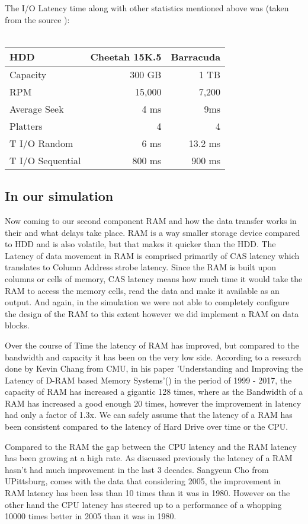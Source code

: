 \documentclass[12pt]{article}
\begin{document}
The I/O Latency time along with other statistics mentioned above was (taken from the source \cite{three}): 
\\\\
\begin{tabular}{|l|rr|}
  \hline
  HDD & Cheetah 15K.5 & Barracuda\\
  \hline
  Capacity & 300 GB & 1 TB\\
  \hline
  RPM & 15,000 & 7,200\\
  \hline
  Average Seek & 4 ms & 9ms\\
  \hline
  Platters & 4 & 4\\
  \hline
  T I/O Random & 6 ms & 13.2 ms\\
  \hline
  T I/O Sequential & 800 ms & 900 ms\\
  \hline
\end {tabular}

\subsection*{In our simulation}

Now coming to our second component RAM and how the data transfer works in their and what delays take place.
RAM is a way smaller storage device compared to HDD and is also volatile, but that makes it quicker than
the HDD. The Latency of data movement in RAM is comprised primarily of CAS latency which translates to
Column Address strobe latency. Since the RAM is built upon columns or cells of memory,
CAS latency means how much time it would take the RAM to access the memory cells, read the data and make it
available as an output. And again, in the simulation we were not able to completely configure the design of
the RAM to this extent however we did implement a RAM on data blocks.

Over the course of Time the latency of RAM has improved, but compared to the bandwidth and capacity it has
been on the very low side. According to a research done by Kevin Chang from CMU, in his paper 'Understanding
and Improving the Latency of D-RAM based Memory Systems'(\cite {DRAMTimings}) in the period of 1999 - 2017,
the capacity of RAM has increased a gigantic 128 times, where as the Bandwidth of a RAM has increased a
good enough 20 times, however the improvement in latency had  only a factor of 1.3x. We can safely assume
that the latency of a RAM has been consistent compared to the latency of Hard Drive over time or the CPU.

Compared to the RAM the gap between the CPU latency and the RAM latency has been growing at a high rate. As
discussed previously the latency of a RAM hasn't had much improvement in the last 3 decades. Sangyeun Cho
from UPittsburg, comes with the data that considering 2005, the improvement in RAM latency has been less than
10 times than it was in 1980. However on the other hand the CPU latency has steered up to a performance of
a whopping 10000 times better in 2005 than it was in 1980.
\end{document}
